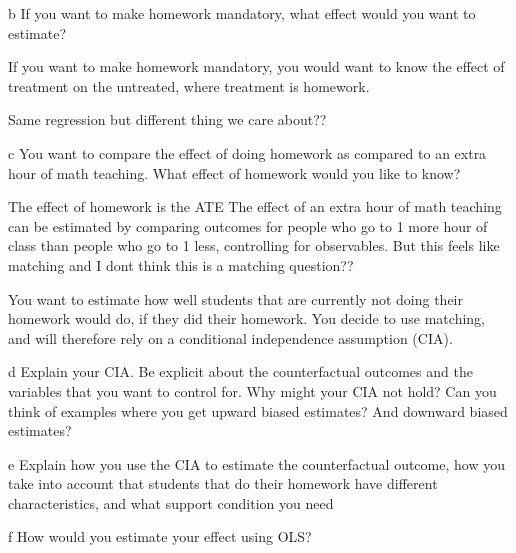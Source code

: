 \documentclass{article}
\begin{document}
\begin{problem}{b}
If you want to make homework mandatory, what effect would you want to estimate?
\end{problem}
\begin{solution}
If you want to make homework mandatory, you would want to know the effect of treatment on the untreated, where treatment is homework.

Same regression but different thing we care about??
\end{solution}

\begin{problem}{c}
You want to compare the effect of doing homework as compared to an extra hour of math teaching. What effect of homework would you like to know?
\end{problem}
\begin{solution}
The effect of homework is the ATE
The effect of an extra hour of math teaching can be estimated by comparing outcomes for people who go to 1 more hour of class than people who go to 1 less, controlling for observables. But this feels like matching and I dont think this is a matching question??
\end{solution}

You want to estimate how well students that are currently not doing their homework would do, if they did their homework. You decide to use matching, and will therefore rely on a conditional independence assumption (CIA).

\begin{problem}{d}
Explain your CIA. Be explicit about the counterfactual outcomes and the variables that you want to control for. Why might your CIA not hold? Can you think of examples where you get upward biased estimates? And downward biased estimates?
\end{problem}
\begin{solution}

\end{solution}

\begin{problem}{e}
Explain how you use the CIA to estimate the counterfactual outcome, how you take into account that students that do their homework have different characteristics, and what support condition you need
\end{problem}
\begin{solution}
\end{solution}

\begin{problem}{f}
How would you estimate your effect using OLS?
\end{problem}
\begin{solution}
\end{solution}
\end{document}
